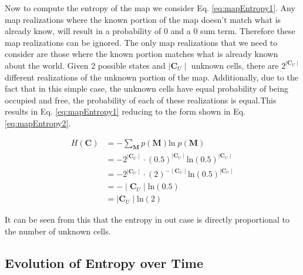 \documentclass[a4paper,12pt]{article}
\begin{document}
			Now to compute the entropy of the map we consider Eq. \ref{eq:mapEntropy1}. Any map realizations where the known portion of the map doesn't match what is already know, will result in a probability of 0 and a 0 sum term. Therefore these map realizations can be ignored. The only map realizations that we need to consider are those where the known portion matches what is already known about the world. Given 2 possible states and $\mid \textbf{C}_U \mid$ unknown cells, there are $2^{\mid \textbf{C}_U \mid}$ different realizations of the unknown portion of the map. Additionally, due to the fact that in this simple case, the unknown cells have equal probability of being occupied and free, the probability of each of these realizations is equal.This results in Eq. \ref{eq:mapEntropy1} reducing to the form shown in Eq. \ref{eq:mapEntropy2}.

			\begin{equation}
				\begin{split}
					H \left(\textbf{C}\right) &= - \sum_{\textbf{M}} p\left(\textbf{M}\right)\text{ln} \; p\left(\textbf{M}\right) \\
					&= - 2^{\mid \textbf{C}_U \mid} \cdot \left(0.5\right)^{\mid \textbf{C}_U \mid} \text{ln} \left(0.5\right)^{\mid \textbf{C}_U \mid} \\
					&= - 2^{\mid \textbf{C}_U \mid} \cdot \left(2\right)^{-\mid \textbf{C}_U \mid} \text{ln} \left(0.5\right)^{\mid \textbf{C}_U \mid} \\
					&= - \mid \textbf{C}_U \mid \text{ln} \left(0.5\right) \\
					&= \mid \textbf{C}_U \mid \text{ln} \left(2\right)
				\end{split}
				\label{eq:mapEntropy2}
			\end{equation}

			It can be seen from this that the entropy in out case is directly proportional to the number of unknown cells.

		\subsection{Evolution of Entropy over Time}
\end{document}
